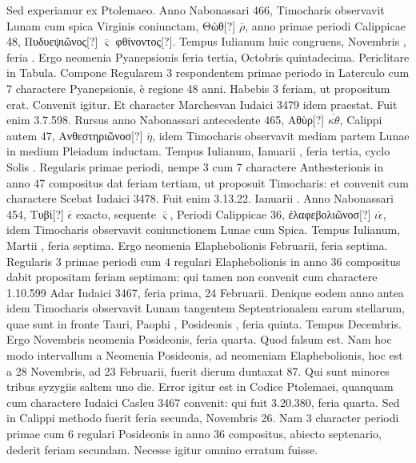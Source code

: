 Sed experiamur ex Ptolemaeo.
Anno Nabonassari 466, Timocharis observavit Lunam cum
spica Virginis coniunctam, \textgreek{Θὼθ[?]} $\overline\rho$,
anno primae periodi Calippicae 48,
\textgreek{Πυδυεψιῶνος[?]} $\overline\varsigma$ \textgreek{φθίνοντος[?]}.
Tempus Iulianum huic congruens, Novembris
, feria .
Ergo neomenia Pyanepsionis feria tertia, Octobris
quintadecima.
Periclitare in Tabula.
Compone Regularem 3
respondentem primae periodo in Laterculo cum 7 charactere Pyanepsionis,
è regione 48 anni.
Habebis 3 feriam, ut propositum erat.
Convenit
igitur.
Et character Marchesvan Iudaici 3479 idem praestat.
Fuit enim 3.7.598.
Rursus anno Nabonassari antecedente 465, \textgreek{Αθὺρ[?]}
$\overline{\kappa\theta}$, Calippi autem 47, \textgreek{Ανθεστηριῶνοσ[?]}
 $\overline\eta$, idem Timocharis observavit
mediam partem Lunae in medium Pleiadum inductam.
Tempus Iulianum,
Ianuarii , feria tertia, cyclo Solis .
Regularis primae
periodi, nempe 3 cum 7 charactere Anthesterionis in anno 47 compositus
dat feriam tertiam, ut proposuit Timocharis: et convenit cum
charactere Scebat Iudaici 3478.
Fuit enim 3.13.22. Ianuarii .
Anno Nabonassari 454, \textgreek{Τυβὶ[?]} $\overline\epsilon$
 exacto, sequente $\overline\varsigma$, Periodi Calippicae
36, \textgreek{ἐλαφεβολιῶνοσ[?]} $\overline{\iota\epsilon}$, idem
 Timocharis observavit coniunctionem
Lunae cum Spica.
Tempus Iulianum, Martii , feria septima.
Ergo neomenia Elaphebolionis  Februarii, feria septima.
Regularis
3 primae periodi cum 4 regulari Elaphebolionis in anno 36 compositus
dabit propositam feriam septimam: qui tamen non convenit
cum charactere 1.10.599 Adar Iudaici 3467, feria prima, 24 Februarii.
Denique eodem anno antea idem Timocharis observavit
Lunam tangentem Septentrionalem earum stellarum, quae sunt in
fronte Tauri, Paophi , Posideonis , feria quinta.
Tempus 
Decembris.
Ergo  Novembris neomenia Posideonis, feria
quarta.
Quod falsum est.
Nam hoc modo intervallum a Neomenia
Posideonis, ad neomeniam Elaphebolionis, hoc est a 28 Novembris,
ad 23 Februarii, fuerit dierum duntaxat 87.
Qui sunt minores tribus syzygiis
saltem uno die.
Error igitur est in Codice Ptolemaei, quanquam
cum charactere Iudaici Casleu 3467 convenit: qui fuit 3.20.380,
feria quarta.
Sed in Calippi methodo fuerit feria secunda, Novembris
26.
Nam 3 character periodi primae cum 6 regulari Posideonis
in anno 36 compositus, abiecto septenario, dederit feriam secundam.
Necesse igitur omnino erratum fuisse.

